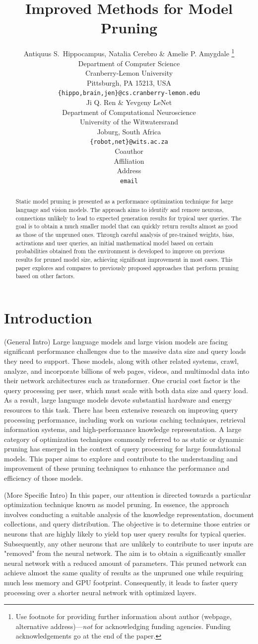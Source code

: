 \documentclass{article} %
\title{Improved Methods for Model Pruning}
\author{Antiquus S.~Hippocampus, Natalia Cerebro \& Amelie P. Amygdale \thanks{ Use footnote for providing further information
about author (webpage, alternative address)---\emph{not} for acknowledging
funding agencies.  Funding acknowledgements go at the end of the paper.} \\
Department of Computer Science\\
Cranberry-Lemon University\\
Pittsburgh, PA 15213, USA \\
\texttt{\{hippo,brain,jen\}@cs.cranberry-lemon.edu} \\
\And
Ji Q. Ren \& Yevgeny LeNet \\
Department of Computational Neuroscience \\
University of the Witwatersrand \\
Joburg, South Africa \\
\texttt{\{robot,net\}@wits.ac.za} \\
\AND
Coauthor \\
Affiliation \\
Address \\
\texttt{email}
}
\begin{document}
\maketitle

\begin{abstract}
Static model pruning is presented as a performance optimization technique for large language and vision models. The approach aims to identify and remove neurons, connections unlikely to lead to expected generation results for typical user queries. The goal is to obtain a much smaller model that can quickly return results almost as good as those of the unpruned ones. Through careful analysis of pre-trained weights, bias, activations and user queries, an initial mathematical model based on certain probabilities obtained from the environment is developed to improve on previous results for pruned model size, achieving significant improvement in most cases. This paper explores and compares to previously proposed approaches that perform pruning based on other factors.
\end{abstract}

\section{Introduction}
\label{intro}
(General Intro) Large language models and large vision models are facing significant performance challenges due to the massive data size and query loads they need to support. These models, along with other related systems, crawl, analyze, and incorporate billions of web pages, videos, and multimodal data into their network architectures such as transformer. 
One crucial cost factor is the query processing per user, which must scale with both data size and query load. As a result, large language models devote substantial hardware and energy resources to this task. There has been extensive research on improving query processing performance, including work on various caching techniques, retrieval information systems, and high-performance knowledge representation. 
A large category of optimization techniques commonly referred to as static or dynamic pruning has emerged in the context of query processing for large foundational models. This paper aims to explore and contribute to the understanding and improvement of these pruning techniques to enhance the performance and efficiency of those models.

(More Specific Intro) In this paper, our attention is directed towards a particular optimization technique known as model pruning. In essence, the approach involves conducting a suitable analysis of the knowledge representation, document collections, and query distribution. The objective is to determine those entries or neurons that are highly likely to yield top user query results for typical queries. Subsequently, any other neurons that are unlikely to contribute to user inputs are "removed" from the neural network. The aim is to obtain a significantly smaller neural network with a reduced amount of parameters. This pruned network can achieve almost the same quality of results as the unpruned one while requiring much less memory and GPU footprint. Consequently, it leads to faster query processing over a shorter neural network with optimized layers.
\end{document}
